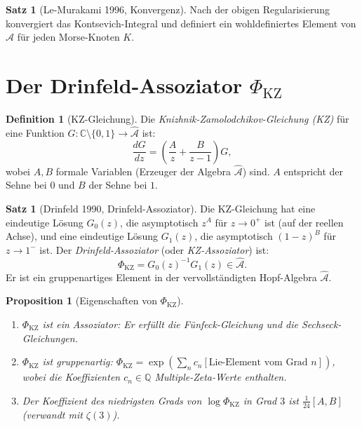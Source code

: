 \documentclass[12pt,a4paper]{amsart}
\newtheorem{proposition}[theorem]{Proposition}
\theoremstyle{definition}
\newtheorem{satz}[theorem]{Satz}
\newtheorem{definition_de}[theorem]{Definition}
\newcommand{\Q}{\mathbb{Q}}
\newcommand{\C}{\mathbb{C}}
\begin{document}
\begin{satz}[Le-Murakami 1996, Konvergenz]\label{satz:konvergenz}
Nach der obigen Regularisierung konvergiert das Kontsevich-Integral
und definiert ein wohldefiniertes Element von $\hat{\mathcal{A}}$ für
jeden Morse-Knoten $K$.
\end{satz}

\section{Der Drinfeld-Assoziator $\Phi_{\mathrm{KZ}}$}\label{sec:assoziator}

\begin{definition_de}[KZ-Gleichung]
Die \emph{Knizhnik-Zamolodchikov-Gleichung (KZ)} für eine Funktion
$G: \C\setminus\{0,1\} \to \hat{\mathcal{A}}$ ist:
\[
  \frac{dG}{dz} = \left(\frac{A}{z} + \frac{B}{z-1}\right) G,
\]
wobei $A, B$ formale Variablen (Erzeuger der Algebra $\hat{\mathcal{A}}$)
sind.  $A$ entspricht der Sehne bei $0$ und $B$ der Sehne bei $1$.
\end{definition_de}

\begin{satz}[Drinfeld 1990, Drinfeld-Assoziator]\label{satz:drinfeld}
Die KZ-Gleichung hat eine eindeutige Lösung $G_0(z)$, die asymptotisch
$z^A$ für $z \to 0^+$ ist (auf der reellen Achse), und eine eindeutige
Lösung $G_1(z)$, die asymptotisch $(1-z)^B$ für $z \to 1^-$ ist.
Der \emph{Drinfeld-Assoziator} (oder \emph{KZ-Assoziator}) ist:
\[
  \Phi_{\mathrm{KZ}} = G_0(z)^{-1} G_1(z) \in \hat{\mathcal{A}}.
\]
Er ist ein gruppenartiges Element in der vervollständigten Hopf-Algebra
$\hat{\mathcal{A}}$.
\end{satz}

\begin{proposition}[Eigenschaften von $\Phi_{\mathrm{KZ}}$]
\begin{enumerate}[label=(\roman*)]
  \item $\Phi_{\mathrm{KZ}}$ ist ein Assoziator: Er erfüllt die Fünfeck-Gleichung
        und die Sechseck-Gleichungen.
  \item $\Phi_{\mathrm{KZ}}$ ist gruppenartig: $\Phi_{\mathrm{KZ}} = \exp(\sum_n c_n [\text{Lie-Element vom Grad } n])$,
        wobei die Koeffizienten $c_n \in \Q$ Multiple-Zeta-Werte enthalten.
  \item Der Koeffizient des niedrigsten Grads von $\log \Phi_{\mathrm{KZ}}$
        in Grad $3$ ist $\frac{1}{24}[A, B]$ (verwandt mit $\zeta(3)$).
\end{enumerate}
\end{proposition}
\end{document}
